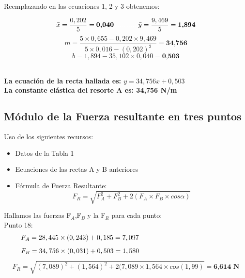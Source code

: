 \documentclass[10pt]{article}
\begin{document}
\vspace{0,2cm}
Reemplazando en las ecuaciones 1, 2 y 3 obtenemos:

\begin{equation*}
    \Bar{x} = \frac{0,202}{5} = \textbf{0,040} \textcolor{Blanco}{.............} \Bar{y} = \frac{9,469}{5} = \textbf{1,894}
\end{equation*}
\vspace{0,1cm}
\begin{equation*}
    m = \frac{5\times0,655-0,202\times9,469}{5\times0,016 - (0,202)^{2}} = \textbf{34,756} 
\end{equation*}
\vspace{0,1cm}
\begin{equation*}
    b = 1,894 - 35,102\times0,040 = \textbf{0,503}
\end{equation*}\\

\vspace{-0,7cm}
\begin{center}
\textbf{La ecuación de la recta hallada es: $y = 34,756x + 0,503$}\\[0,3cm]
\textbf{La constante elástica del resorte A es: 34,756 N/m}
\end{center}

\subsection{Módulo de la Fuerza resultante en tres puntos}\vspace{2mm}

Uso de los siguientes recursos:
\begin{itemize}
    \item Datos de la Tabla 1
    \item Ecuaciones de las rectas A y B anteriores
    \item Fórmula de Fuerza Resultante:
    \large{\begin{equation}
        F_{R} = \sqrt{F^{2}_{A} + F^{2}_{B} + 2(F_{A} \times F_{B} \times cos \alpha)}
    \end{equation}}
\end{itemize}

\vspace{0,2cm}
Hallamos las fuerzas F$_{A}$,F$_{B}$ y la F$_{R}$  para cada punto:\\

Punto 18:
 \begin{equation*}
    F_{A} = 28,445 \times (0,243) + 0,185 = 7,097
    \textcolor{Blanco}{--------------}
\end{equation*}
\begin{equation*}
    F_{B} = 34,756 \times (0,031) + 0,503 = 1,580
    \textcolor{Blanco}{--------------}
\end{equation*}  
\begin{equation*}
    F_{R} = \sqrt{(7,089)^{2} + (1,564)^{2} + 2(7,089 \times 1,564 \times cos(1,99)} = \textbf{6,614 N}
\end{equation*}
\vspace{-0,2cm}
\end{document}
